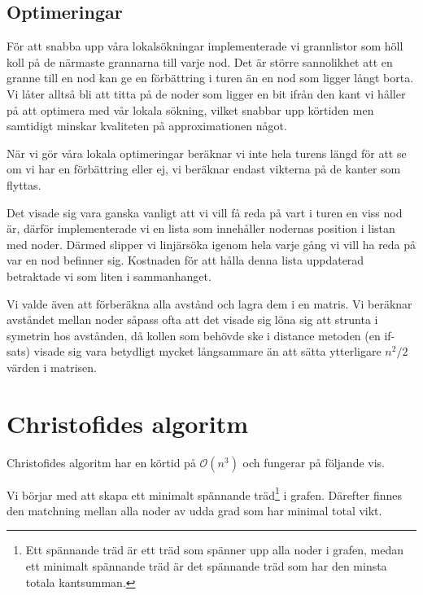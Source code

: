 \documentclass[a4paper,12pt]{article}
\renewcommand{\O}{\ensuremath{\mathcal{O}}}
\renewcommand{\*}{\ensuremath{\cdot}}
\begin{document}
\subsection{Optimeringar}

För att snabba upp våra lokalsökningar implementerade vi grannlistor som höll
koll på de närmaste grannarna till varje nod. Det är större sannolikhet att en
granne till en nod kan ge en förbättring i turen än en nod som ligger långt
borta. Vi låter alltså bli att titta på de noder som ligger en bit ifrån den
kant vi håller på att optimera med vår lokala sökning, vilket snabbar upp
körtiden men samtidigt minskar kvaliteten på approximationen något.

När vi gör våra lokala optimeringar beräknar vi inte hela turens längd för att
se om vi har en förbättring eller ej, vi beräknar endast vikterna på de kanter
som flyttas.

Det visade sig vara ganska vanligt att vi vill få reda på vart i turen en viss
nod är, därför implementerade vi en lista som innehåller nodernas position i
listan med noder. Därmed slipper vi linjärsöka igenom hela varje gång vi vill ha
reda på var en nod befinner sig. Kostnaden för att hålla denna lista uppdaterad
betraktade vi som liten i sammanhanget.

Vi valde även att förberäkna alla avstånd och lagra dem i en matris. Vi beräknar
avståndet mellan noder såpass ofta att det visade sig löna sig att strunta i
symetrin hos avstånden, då kollen som behövde ske i distance metoden (en
if-sats) visade sig vara betydligt mycket långsammare än att sätta ytterligare
$n^2/2$ värden i matrisen.



\section{Christofides algoritm} 

Christofides algoritm har en körtid på $\O(n^3)$ och fungerar på följande vis.

Vi börjar med att skapa ett minimalt spännande träd\footnote{Ett spännande träd
är ett träd som spänner upp alla noder i grafen, medan ett minimalt spännande
träd är det spännande träd som har den minsta totala kantsumman.} i grafen.
Därefter finnes den matchning mellan alla noder av udda grad som har minimal 
total vikt.  
\end{document}
